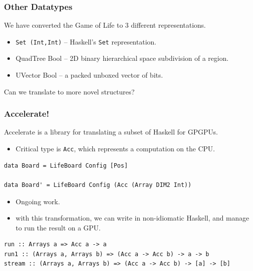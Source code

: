 \documentclass[smaller]{beamer}
\begin{document}
\begin{frame}[fragile]
\frametitle{Other Datatypes}

We have converted the Game of Life to 3 different representations.

\frameskip

\begin{itemize}
\item \verb|Set (Int,Int)| -- Haskell's \verb|Set| representation.
\item QuadTree Bool -- 2D binary hierarchical space subdivision of a region.
\item UVector Bool -- a packed unboxed vector of bits.
\end{itemize}

\frameskip

Can we translate to more novel structures?

\end{frame}

\begin{frame}[fragile]
\frametitle{Accelerate!}

Accelerate is a library for translating a subset of Haskell for GPGPUs.

\begin{itemize}
\item Critical type is \verb|Acc|, which represents a computation on the CPU.
\end{itemize}

\begin{codeblock}[0.8]
\begin{verbatim}
data Board = LifeBoard Config [Pos]

data Board' = LifeBoard Config (Acc (Array DIM2 Int))
\end{verbatim}
\end{codeblock}


\frameskip
\begin{itemize}
\item Ongoing work.

\item with this transformation, we can write in non-idiomatic Haskell,
and manage to run the result on a GPU.
\end{itemize}


\begin{codeblock}[1]
\begin{verbatim}
run :: Arrays a => Acc a -> a
run1 :: (Arrays a, Arrays b) => (Acc a -> Acc b) -> a -> b
stream :: (Arrays a, Arrays b) => (Acc a -> Acc b) -> [a] -> [b]
\end{verbatim}
\end{codeblock}


\end{frame}
\end{document}
